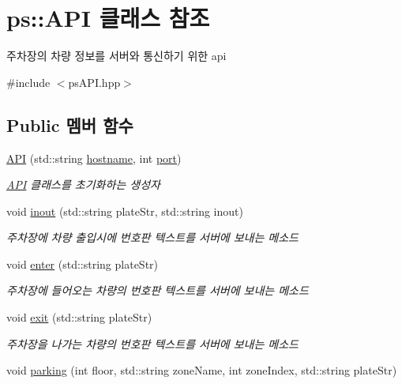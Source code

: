 \hypertarget{classps_1_1_a_p_i}{}\section{ps\+:\+:A\+PI 클래스 참조}
\label{classps_1_1_a_p_i}


주차장의 차량 정보를 서버와 통신하기 위한 api  




{\ttfamily \#include $<$ps\+A\+P\+I.\+hpp$>$}

\subsection*{Public 멤버 함수}
\begin{DoxyCompactItemize}
\item 
\hyperlink{classps_1_1_a_p_i_aecd75588093e5e2dbb9b889ec2162b37}{A\+PI} (std\+::string \hyperlink{classps_1_1_a_p_i_a0d5f99f63a0697e0764f3ee9794a5c26}{hostname}, int \hyperlink{classps_1_1_a_p_i_a58739732fd3c99f9725e5e1376bd5dd7}{port})
\begin{DoxyCompactList}\small\item\em \hyperlink{classps_1_1_a_p_i}{A\+PI} 클래스를 초기화하는 생성자 \end{DoxyCompactList}\item 
void \hyperlink{classps_1_1_a_p_i_a1b8af0de54794775c106e3e68fbe24a6}{inout} (std\+::string plate\+Str, std\+::string inout)
\begin{DoxyCompactList}\small\item\em 주차장에 차량 출입시에 번호판 텍스트를 서버에 보내는 메소드 \end{DoxyCompactList}\item 
void \hyperlink{classps_1_1_a_p_i_a4d7bcb7036c05867179a9a199862f192}{enter} (std\+::string plate\+Str)
\begin{DoxyCompactList}\small\item\em 주차장에 들어오는 차량의 번호판 텍스트를 서버에 보내는 메소드 \end{DoxyCompactList}\item 
void \hyperlink{classps_1_1_a_p_i_ae8af546ae3b183fec0c6d3f68a7e9649}{exit} (std\+::string plate\+Str)
\begin{DoxyCompactList}\small\item\em 주차장을 나가는 차량의 번호판 텍스트를 서버에 보내는 메소드 \end{DoxyCompactList}\item 
void \hyperlink{classps_1_1_a_p_i_af7829fef44876d076e41f18e9978609e}{parking} (int floor, std\+::string zone\+Name, int zone\+Index, std\+::string plate\+Str)

\end{DoxyCompactItemize}
